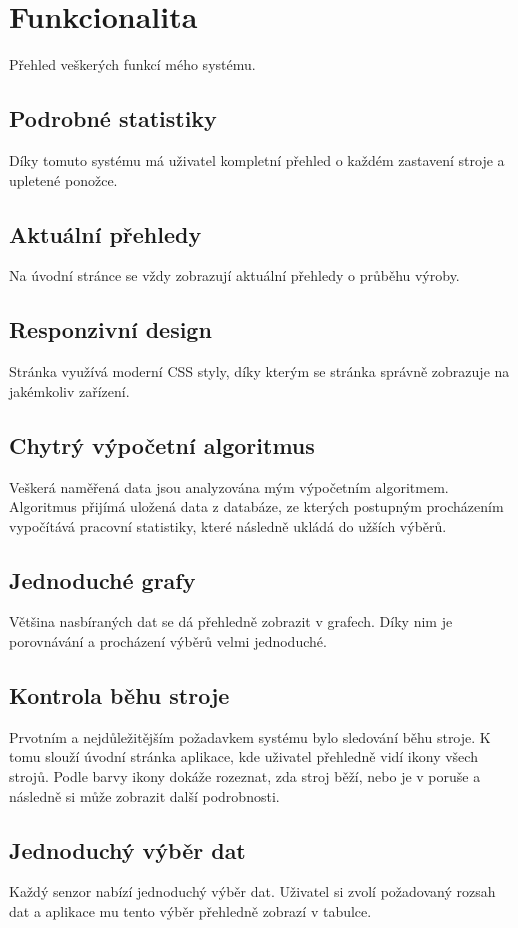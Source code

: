 \section{Funkcionalita}
Přehled veškerých funkcí mého systému.


\subsection{Podrobné statistiky}
Díky tomuto systému má uživatel kompletní přehled o každém zastavení stroje a upletené ponožce.


\subsection{Aktuální přehledy}
Na úvodní stránce se vždy zobrazují aktuální přehledy o průběhu výroby.


\subsection{Responzivní design}
Stránka využívá moderní CSS styly, díky kterým se stránka správně zobrazuje na jakémkoliv zařízení. 


\subsection{Chytrý výpočetní algoritmus}
Veškerá naměřená data jsou analyzována mým výpočetním algoritmem.
Algoritmus přijímá uložená data z databáze, ze kterých postupným procházením vypočítává pracovní statistiky, které následně ukládá do užších výběrů.


\subsection{Jednoduché grafy}
Většina nasbíraných dat se dá přehledně zobrazit v grafech. 
Díky nim je porovnávání a procházení výběrů velmi jednoduché. 


\subsection{Kontrola běhu stroje}
Prvotním a nejdůležitějším požadavkem systému bylo sledování běhu stroje.
K tomu slouží úvodní stránka aplikace, kde uživatel přehledně vidí ikony všech strojů.
Podle barvy ikony dokáže rozeznat, zda stroj běží, nebo je v poruše a následně si může zobrazit další podrobnosti. 

\subsection{Jednoduchý výběr dat}
Každý senzor nabízí jednoduchý výběr dat.
Uživatel si zvolí požadovaný rozsah dat a aplikace mu tento výběr přehledně zobrazí v tabulce.


